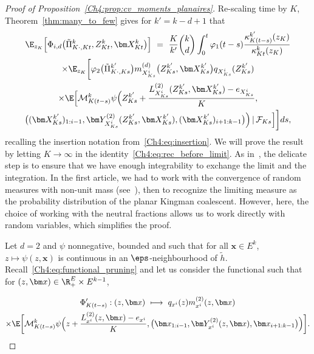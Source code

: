 \begin{refsegment}
\begin{proof}[Proof of Proposition~\ref{Ch4:prop:cv_moments_planaires}]
Re-scaling time by $K$, Theorem~\ref{thm:many_to_few} gives for $k'=k-d+1$ that 
\begin{multline}\label{Ch4:eq:rec_before_limit}
    \E_{z_K}\Big[\Phi_{i,d}\big(\tilde{\Pi}^k_{K\cdot,Kt}, Z^k_{Kt}, \bm X^k_{Kt} \big)\Big]
    \ =\ 
    \frac{K}{k'}\binom{k}{d}\int_0^{t} \varphi_1(t-s)\frac{\kappa^{k'}_{K(t-s)}(z_K)}{\kappa^{k}_{Kt}(z_K)}\\
    \times\E_{z_K}\bigg[\varphi_2\big(\tilde{\Pi}^{k'}_{K\cdot,Ks}\big) m^{(d)}_{X^{i}_{Ks}}\big(  Z^{k'}_{Ks}, \bm X^{k'}_{Ks}\big)q_{X^i_{Ks}}( Z^{k'}_{Ks}) \\
  \times \E\Big[\mathcal{M}^k_{K(t-s)}{\psi}\Big(Z^{k'}_{Ks}+ \frac{L^{(2)}_{X^i_{Ks}}(Z^{k'}_{Ks}, \bm X^{k'}_{Ks})-e_{X^i_{Ks}}}{K},\\
  \big((\bm X^{k'}_{Ks})_{1:i-1},\bm Y^{(2)}_{X^i_{Ks}}(Z^{k'}_{Ks}, \bm X^{k'}_{Ks}),(\bm X^{k'}_{Ks})_{i+1:k-1}\big)\Big)\, \vert\, \mathcal{F}_{Ks}\Big]\bigg] ds,
\end{multline}
recalling the insertion notation from~\eqref{Ch4:eq:insertion}.
We will prove the result by letting $K \to \infty$ in the identity~\eqref{Ch4:eq:rec_before_limit}. As in~\cite{AFRS_2025}, the delicate step is to ensure that we have enough integrability to exchange the limit and the integration. In the first article, we had to work with the convergence of random measures with non-unit mass (see~\citet[Proposition~4.1]{AFRS_2025}), then to recognize the limiting measure as the probability distribution of the planar Kingman coalescent.
 However, here, the choice of working with the neutral fractions allows us to work directly with random variables, which simplifies the proof.

Let $d = 2$ and $\psi$ nonnegative, bounded and such that for all $\bm x\in E^{k}$, $z\mapsto \psi(z, \bm x)$ is continuous in an $\eps$-neighbourhood of $\tilde h$. 
Recall~\eqref{Ch4:eq:functional_pruning} and let us consider the functional such that for $( z,\bm x)\in \R_+^E\times E^{k-1}$,

\begin{multline*}
\Phi'_{K(t-s)} :(z,\bm x) \ \longmapsto\ q_{x^i}(z) m^{(2)}_{x^i}( z, \bm x)\\
\times \E\bigg[\mathcal{M}^k_{K(t-s)}{\psi}\Big(z + \frac{L^{(2)}_{x^i}(z, \bm x)-e_{x^i}}{K},\big(\bm x_{1:i-1},\bm Y^{(2)}_{x^i}(z, \bm x),\bm x_{i+1:k-1}\big)\Big)\bigg].
\end{multline*}


\end{proof}
\end{refsegment}
